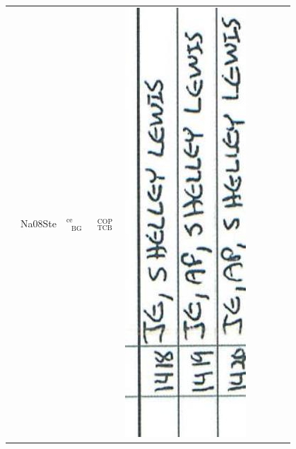 \documentclass[10pt]{article}
\begin{document}
\begin{center}
\begin{tabular}{|c|c|c|c|c|c|c|c|c|c|c|}
 & Na08Ste & \({ }_{\substack{\text { BG }}}^{\text {ce }}\) & \({ }_{\text {TCB }}^{\text {COP }}\) & \multicolumn{3}{|l|}{\multirow[t]{2}{*}{\includegraphics[max width=\textwidth]{2025_02_27_dd68c3d38de88f0516d9g-082(5)}
}}
\end{tabular}
\end{center}
\end{document}

